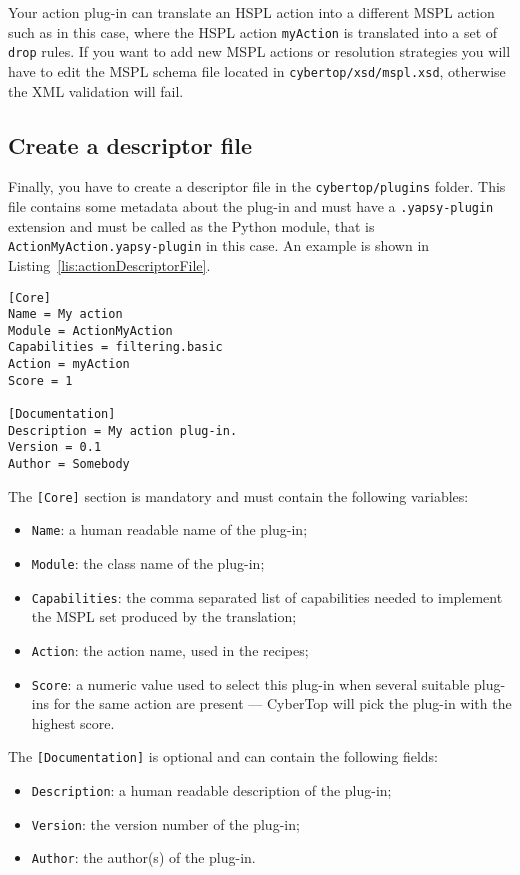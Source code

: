 \documentclass{scrartcl}
\begin{document}
Your action plug-in can translate an HSPL action into a different MSPL action such as in this case, where the HSPL action \lstinline|myAction| is translated into a set of \lstinline|drop| rules. If you want to add new MSPL actions or resolution strategies you will have to edit the MSPL schema file located in \lstinline|cybertop/xsd/mspl.xsd|, otherwise the XML validation will fail.

\subsection{Create a descriptor file}

Finally, you have to create a descriptor file in the \lstinline|cybertop/plugins| folder. This file contains some metadata about the plug-in and must have a \lstinline|.yapsy-plugin| extension and must be called as the Python module, that is \lstinline|ActionMyAction.yapsy-plugin| in this case. An example is shown in Listing~\ref{lis:actionDescriptorFile}.

\begin{lstlisting}[caption = Example of a action descriptor., label = lis:actionDescriptorFile]
[Core]
Name = My action
Module = ActionMyAction
Capabilities = filtering.basic
Action = myAction
Score = 1

[Documentation]
Description = My action plug-in.
Version = 0.1
Author = Somebody
\end{lstlisting}

The \lstinline|[Core]| section is mandatory and must contain the following variables:

\begin{itemize}
	\item \lstinline|Name|: a human readable name of the plug-in;
	\item \lstinline|Module|: the class name of the plug-in;
	\item \lstinline|Capabilities|: the comma separated list of capabilities needed to implement the MSPL set produced by the translation;
	\item \lstinline|Action|: the action name, used in the recipes;
	\item \lstinline|Score|: a numeric value used to select this plug-in when several suitable plug-ins for the same action are present --- CyberTop will pick the plug-in with the highest score.
\end{itemize}

The \lstinline|[Documentation]| is optional and can contain the following fields:

\begin{itemize}
	\item \lstinline|Description|: a human readable description of the plug-in;
	\item \lstinline|Version|: the version number of the plug-in;
	\item \lstinline|Author|: the author(s) of the plug-in.
\end{itemize}
\end{document}
